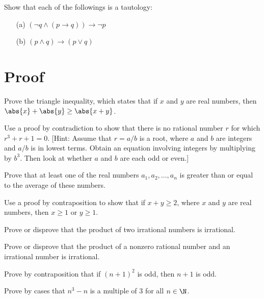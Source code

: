 \documentclass[11pt, oneside]{article}
\begin{document}
\begin{question}
	Show that each of the followings is a tautology:
	\begin{itemize}
		\item[(a)] $(\neg q\wedge (p\rightarrow q))\rightarrow\neg p$
		\item[(b)] $(p\wedge q)\rightarrow(p\vee q)$
	\end{itemize}
\end{question}



\section{Proof}
\begin{question}
	Prove the triangle inequality, which states that if $x$ and
	$y$ are real numbers, then $\abs{x} + \abs{y} \ge \abs{x + y}$.
\end{question}
\begin{question}
	Use a proof by contradiction to show that there is no rational
	number $r$ for which $r^3 + r + 1 = 0.$ [Hint: Assume
	that $r = a/b$ is a root, where $a$ and $b$ are integers and $a/b$
	is in lowest terms. Obtain an equation involving integers
	by multiplying by $b^3$. Then look at whether $a$ and $b$ are
	each odd or even.]
\end{question}
\begin{question}
	Prove that at least one of the real numbers $a_1, a_2,\dots,a_n$ is greater than or equal to the average of these numbers.
\end{question}
\begin{question}
	Use a proof by contraposition to show that if $x + y \ge 2$, where $x$ and $y$ are real numbers, then $x \ge 1$ or $y \ge 1$.
\end{question}
\begin{question}
	Prove or disprove that the product of two irrational numbers is irrational.
\end{question}
\begin{question}
	Prove or disprove that the product of a nonzero rational number and an irrational number is irrational.
\end{question}
\begin{question}
	Prove by contraposition that if $(n+1)^2$ is odd, then $n+1$ is odd.
\end{question}
\begin{question}
		Prove by cases that $n^3-n$ is a multiple of 3 for all $n\in\N$.
\end{question}
\end{document}
